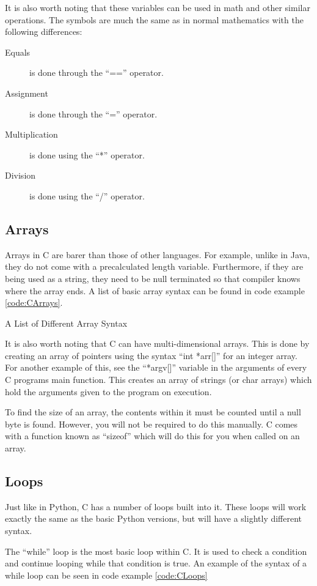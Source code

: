 			It is also worth noting that these variables can be used in math and other similar operations.
			The symbols are much the same as in normal mathematics with the following differences:
			\begin{description}
				\item[Equals] is done through the ``=='' operator.
				\item[Assignment] is done through the ``='' operator.
				\item[Multiplication] is done using the ``*'' operator.
				\item[Division] is done using the ``/'' operator.
			\end{description}

		\subsection{Arrays}
			Arrays in C are barer than those of other languages.
			For example, unlike in Java, they do not come with a precalculated length variable.
			Furthermore, if they are being used as a string, they need to be null terminated so that compiler knows where the array ends.
			A list of basic array syntax can be found in code example \ref{code:CArrays}.
			\begin{code}
				\caption{A List of Different Array Syntax}
				\label{code:CArrays}
			\end{code}
			It is also worth noting that C can have multi-dimensional arrays.
			This is done by creating an array of pointers using the syntax ``int *arr[]'' for an integer array.
			For another example of this, see the ``*argv[]'' variable in the arguments of every C programs main function.
			This creates an array of strings (or char arrays) which hold the arguments given to the program on execution.

			To find the size of an array, the contents within it must be counted until a null byte is found.
			However, you will not be required to do this manually.
			C comes with a function known as ``sizeof'' which will do this for you when called on an array.
		\subsection{Loops}
			Just like in Python, C has a number of loops built into it.
			These loops will work exactly the same as the basic Python versions, but will have a slightly different syntax.

			The ``while'' loop is the most basic loop within C.
			It is used to check a condition and continue looping while that condition is true.
			An example of the syntax of a while loop can be seen in code example \ref{code:CLoops}

